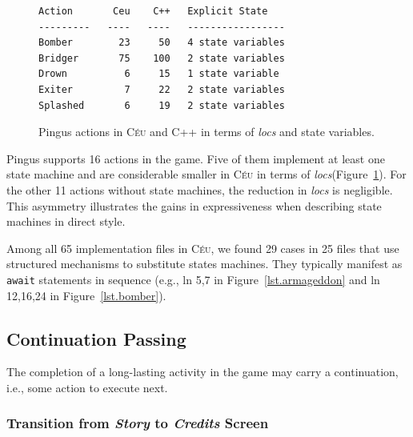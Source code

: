 \documentclass[10pt, conference, compsocconf]{IEEEtran}
\newcommand{\CEU}{\textsc{C\'{e}u}\xspace}
\newcommand{\locs}{\emph{locs}\xspace}
\newcommand{\code}[1] {{\small{\texttt{#1}}}}
\begin{document}
\begin{figure}
{\footnotesize
\begin{verbatim}
Action       Ceu    C++   Explicit State
---------   ----   ----   -----------------
Bomber        23     50   4 state variables
Bridger       75    100   2 state variables
Drown          6     15   1 state variable
Exiter         7     22   2 state variables
Splashed       6     19   2 state variables
\end{verbatim}
\caption{Pingus actions in \CEU and C++ in terms of \locs and state variables.
\label{tab.actions}
}
}
\end{figure}

Pingus supports 16 actions in the game.
Five of them implement at least one state machine and are considerable smaller
in \CEU in terms of \locs (Figure~\ref{tab.actions}).
%
For the other 11 actions without state machines, the reduction in \locs is
negligible.
%
This asymmetry illustrates the gains in expressiveness when describing state
machines in direct style.


Among all 65 implementation files in \CEU, we found 29 cases in 25 files that
use structured mechanisms to substitute states machines.
They typically manifest as \code{await} statements in sequence (e.g.,
ln 5,7 in Figure~\ref{lst.armageddon} and ln 12,16,24 in
Figure~\ref{lst.bomber}).

\subsection{Continuation Passing}
\label{sec.pats.cps}

    The completion of a long-lasting activity in the game may carry a
    continuation, i.e., some action to execute next.

\subsubsection{ Transition from \emph{Story}  to \emph{Credits} Screen}
\end{document}
